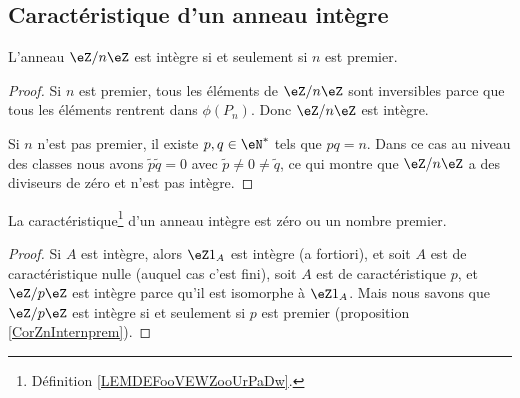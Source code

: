\subsection{Caractéristique d'un anneau intègre}

\begin{corollary}   \label{CorZnInternprem}
    L'anneau \( \eZ/n\eZ\) est intègre si et seulement si \( n\) est premier.
\end{corollary}

\begin{proof}
    Si \( n\) est premier, tous les éléments de \( \eZ/n\eZ\) sont inversibles parce que tous les éléments rentrent dans \( \phi(P_n)\). Donc \( \eZ/n\eZ\) est intègre.

    Si \( n\) n'est pas premier, il existe \( p,q\in\eN^*\) tels que \( pq=n\). Dans ce cas au niveau des classes nous avons \( \tilde p\tilde q=0\) avec \( \tilde p\neq 0\neq\tilde q\), ce qui montre que \( \eZ/n\eZ\) a des diviseurs de zéro et n'est pas intègre.
\end{proof}


\begin{lemma}       \label{LemCaractIntergernbrcartpre}
    La caractéristique\footnote{Définition \ref{LEMDEFooVEWZooUrPaDw}.} d'un anneau intègre est zéro ou un nombre premier.
\end{lemma}

\begin{proof}
    Si \( A\) est intègre, alors \( \eZ 1_A\) est intègre (a fortiori), et soit $A$ est de caractéristique nulle (auquel cas c'est fini), soit $A$ est de caractéristique $p$, et \( \eZ/p\eZ\) est intègre parce qu'il est isomorphe à \( \eZ 1_A\). Mais nous savons que \( \eZ/p\eZ\) est intègre si et seulement si \( p\) est premier (proposition \ref{CorZnInternprem}).
\end{proof}

